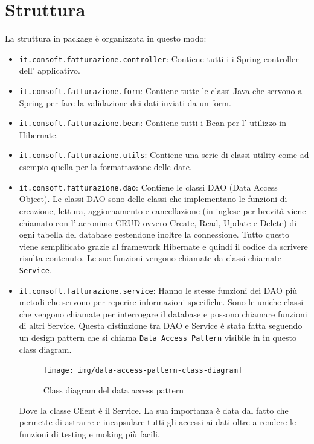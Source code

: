 \documentclass[12pt]{book}
\begin{document}
\section{Struttura}
La struttura in package è organizzata in questo modo:
\begin{itemize}
    \item \texttt{it.consoft.fatturazione.controller}: Contiene tutti i 
        i Spring controller dell' applicativo.
    \item \texttt{it.consoft.fatturazione.form}: Contiene tutte le classi Java 
        che servono a Spring per fare la validazione dei dati inviati da un 
        form\@. 
    \item \texttt{it.consoft.fatturazione.bean}: Contiene tutti i Bean per 
        l' utilizzo in Hibernate.     
    \item \texttt{it.consoft.fatturazione.utils}: Contiene una serie di classi
        utility come ad esempio quella per la formattazione delle date.
    \item \texttt{it.consoft.fatturazione.dao}: Contiene le classi DAO (Data
        Access Object). Le classi DAO sono delle classi che implementano 
        le funzioni di creazione, lettura, aggiornamento e cancellazione 
        (in inglese per brevità viene chiamato con l' acronimo CRUD ovvero
        Create, Read, Update e Delete) di ogni 
        tabella del database gestendone inoltre la connessione. 
        Tutto questo viene semplificato grazie al framework Hibernate e quindi 
        il codice da scrivere risulta contenuto.
        Le sue funzioni vengono chiamate da classi chiamate \texttt{Service}.
    \item \texttt{it.consoft.fatturazione.service}:         
        Hanno le stesse funzioni dei DAO più metodi che servono per 
        reperire informazioni specifiche.
        Sono le uniche classi che vengono chiamate per 
        interrogare il database e possono chiamare funzioni di altri
        Service.
        Questa distinzione tra DAO e Service è stata fatta seguendo un 
        design pattern che si chiama \texttt{Data Access Pattern} visibile in  
        in questo class diagram.
        \begin{figure}[H]
            \centering
            \texttt{[image: img/data-access-pattern-class-diagram]}
            \caption{Class diagram del data access pattern}\label{pattern:dao}
        \end{figure}
        Dove la classe Client è il Service. 
        La sua importanza è data dal fatto che permette  
        di astrarre e incapsulare tutti gli accessi ai dati oltre a rendere
        le funzioni di testing e moking più facili.
\end{itemize}
\end{document}
